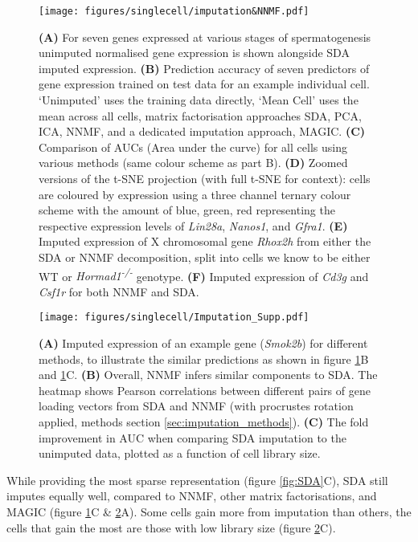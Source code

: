 \begin{figure}[H]
	\centering
	\texttt{[image: figures/singlecell/imputation\&NNMF.pdf]}
	\caption[SDA Imputation]{
		\textbf{(A)} For seven genes expressed at various stages of spermatogenesis unimputed normalised gene expression is shown alongside SDA imputed expression.
		\textbf{(B)} Prediction accuracy of seven predictors of gene expression trained on test data for an example individual cell. ‘Unimputed’ uses the training data directly, ‘Mean Cell’ uses the mean across all cells, matrix factorisation approaches SDA, PCA, ICA, NNMF, and a dedicated imputation approach, MAGIC.
		\textbf{(C)} Comparison of AUCs (Area under the curve) for all cells using various methods (same colour scheme as part B).
		\textbf{(D)} Zoomed versions of the t-SNE projection (with full t-SNE for context): cells are coloured by expression using a three channel ternary colour scheme with the amount of blue, green, red representing the respective expression levels of \textit{Lin28a}, \textit{Nanos1}, and \textit{Gfra1}.
		\textbf{(E)} Imputed expression of X chromosomal gene \textit{Rhox2h} from either the SDA or NNMF decomposition, split into cells we know to be either WT or \textit{Hormad1\textsuperscript{-/-}} genotype.
		\textbf{(F)} Imputed expression of \textit{Cd3g} and \textit{Csf1r} for both NNMF and SDA.}
	\label{fig:imputation}
\end{figure}

\begin{figure}[H]
	\centering
	\texttt{[image: figures/singlecell/Imputation\_Supp.pdf]}
	\caption[Imputation Supplement]{
		\textbf{(A)} Imputed expression of an example gene (\textit{Smok2b}) for different methods, to illustrate the similar predictions as shown in figure \ref{fig:imputation}B and \ref{fig:imputation}C.
		\textbf{(B)} Overall, NNMF infers similar components to SDA. The heatmap shows Pearson correlations between different pairs of gene loading vectors from SDA and NNMF (with procrustes rotation applied, methods section \ref{sec:imputation_methods}).
		\textbf{(C)} The fold improvement in AUC when comparing SDA imputation to the unimputed data, plotted as a function of cell library size.
	}
	\label{fig:imputation_supp}
\end{figure}

While providing the most sparse representation (figure \ref{fig:SDA}C), SDA still imputes equally well, compared to NNMF, other matrix factorisations, and MAGIC \parencite{vanDijk2018Recovering} (figure \ref{fig:imputation}C \& \ref{fig:imputation_supp}A). Some cells gain more from imputation than others, the cells that gain the most are those with low library size (figure \ref{fig:imputation_supp}C).

